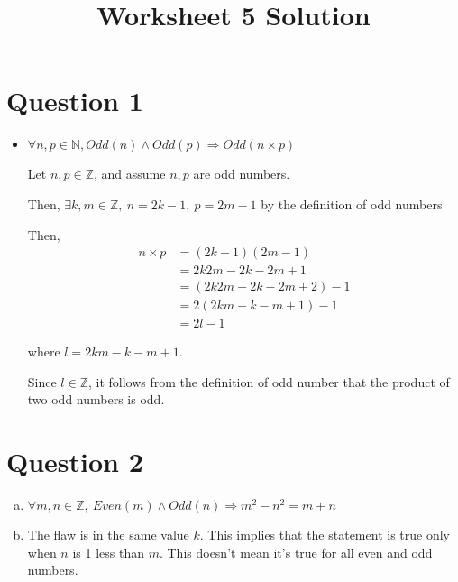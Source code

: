 \documentclass[12pt]{article}
\begin{document}
\title{Worksheet 5 Solution}
\maketitle

\section*{Question 1}
\begin{itemize}
    \item

    $\forall n,p \in \mathbb{N}, Odd(n) \land Odd(p) \Rightarrow Odd(n \times p)$

    \bigskip

    Let $n,p \in \mathbb{Z}$, and assume $n,p$ are odd numbers.

    \bigskip

    Then, $\exists k,m \in \mathbb{Z},\:n = 2k - 1,\: p = 2m -1$ by the definition of
    odd numbers

    \bigskip

    Then,
    \setcounter{equation}{0}
    \begin{align}
        n \times p &= (2k-1)(2m-1)\\
        &= 2k2m - 2k - 2m + 1 \\
        &=(2k2m - 2k - 2m + 2) - 1 \\
        &=2(2km - k - m + 1) - 1\\
        &=2l - 1
    \end{align}

    where $l = 2km - k - m + 1$.

    \bigskip

    Since $l \in \mathbb{Z}$, it follows from the definition of odd number that the product
    of two odd numbers is odd.

\end{itemize}

\section*{Question 2}

\begin{enumerate}[a.]
    \item

    $\forall m,n \in \mathbb{Z},\:Even(m) \land Odd(n) \Rightarrow m^2-n^2 = m + n$

    \item

    The flaw is in the same value $k$. This implies that the statement is true
    only when $n$ is 1 less than $m$. This doesn't mean it's true for all even and
    odd numbers.


\end{enumerate}
\end{document}
